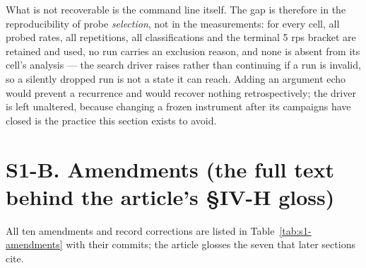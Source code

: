 \documentclass{ieeeaccess}
\begin{document}
What is not recoverable is the command line itself. The gap is therefore in the reproducibility of probe \textit{selection}, not in the measurements: for every cell, all probed rates, all repetitions, all classifications and the terminal 5 rps bracket are retained and used, no run carries an exclusion reason, and none is absent from its cell's analysis --- the search driver raises rather than continuing if a run is invalid, so a silently dropped run is not a state it can reach. Adding an argument echo would prevent a recurrence and would recover nothing retrospectively; the driver is left unaltered, because changing a frozen instrument after its campaigns have closed is the practice this section exists to avoid.

\section*{S1-B. Amendments (the full text behind the article's \S{}IV-H gloss)}

All ten amendments and record corrections are listed in Table~\ref{tab:s1-amendments} with their commits; the article glosses the seven that later sections cite.
\end{document}
